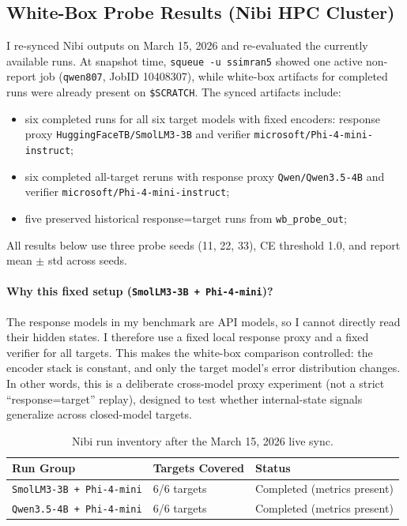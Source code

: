 \documentclass[11pt]{article}
\begin{document}
\subsection{White-Box Probe Results (Nibi HPC Cluster)}

I re-synced Nibi outputs on March 15, 2026 and re-evaluated the currently available runs. At snapshot time, \texttt{squeue -u ssimran5} showed one active non-report job (\texttt{qwen807}, JobID 10408307), while white-box artifacts for completed runs were already present on \texttt{\$SCRATCH}. The synced artifacts include:
\begin{itemize}
    \item six completed runs for all six target models with fixed encoders: response proxy \texttt{HuggingFaceTB/SmolLM3-3B} and verifier \texttt{microsoft/Phi-4-mini-instruct};
    \item six completed all-target reruns with response proxy \texttt{Qwen/Qwen3.5-4B} and verifier \texttt{microsoft/Phi-4-mini-instruct};
    \item five preserved historical response=target runs from \texttt{wb\_probe\_out};
\end{itemize}
All results below use three probe seeds (11, 22, 33), CE threshold 1.0, and report mean $\pm$ std across seeds.

\paragraph{Why this fixed setup (\texttt{SmolLM3-3B + Phi-4-mini})?}
The response models in my benchmark are API models, so I cannot directly read their hidden states. I therefore use a fixed local response proxy and a fixed verifier for all targets. This makes the white-box comparison controlled: the encoder stack is constant, and only the target model's error distribution changes. In other words, this is a deliberate cross-model proxy experiment (not a strict ``response=target'' replay), designed to test whether internal-state signals generalize across closed-model targets.

\begin{table}[H]
\centering
\small
\begin{tabular}{lll}
\toprule
\textbf{Run Group} & \textbf{Targets Covered} & \textbf{Status} \\
\midrule
\texttt{SmolLM3-3B + Phi-4-mini} & 6/6 targets & Completed (metrics present) \\
\texttt{Qwen3.5-4B + Phi-4-mini} & 6/6 targets & Completed (metrics present) \\
\bottomrule
\end{tabular}
\caption{Nibi run inventory after the March 15, 2026 live sync.}
\label{tab:nibi_runs}
\end{table}
\end{document}
